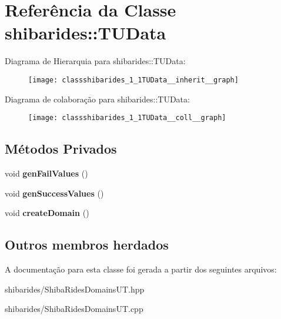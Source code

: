 \hypertarget{classshibarides_1_1TUData}{}\section{Referência da Classe shibarides\+:\+:T\+U\+Data}
\label{classshibarides_1_1TUData}


Diagrama de Hierarquia para shibarides\+:\+:T\+U\+Data\+:\nopagebreak
\begin{figure}[H]
\begin{center}
\leavevmode
\texttt{[image: classshibarides\_1\_1TUData\_\_inherit\_\_graph]}
\end{center}
\end{figure}


Diagrama de colaboração para shibarides\+:\+:T\+U\+Data\+:\nopagebreak
\begin{figure}[H]
\begin{center}
\leavevmode
\texttt{[image: classshibarides\_1\_1TUData\_\_coll\_\_graph]}
\end{center}
\end{figure}
\subsection*{Métodos Privados}
\begin{DoxyCompactItemize}
\item 
void {\bfseries gen\+Fail\+Values} ()\hypertarget{classshibarides_1_1TUData_aec34777c03f4080e1485c656fd19c27f}{}\label{classshibarides_1_1TUData_aec34777c03f4080e1485c656fd19c27f}

\item 
void {\bfseries gen\+Success\+Values} ()\hypertarget{classshibarides_1_1TUData_ad04a9febfb0e66569fbd04fa063c7a56}{}\label{classshibarides_1_1TUData_ad04a9febfb0e66569fbd04fa063c7a56}

\item 
void {\bfseries create\+Domain} ()\hypertarget{classshibarides_1_1TUData_a09460d965b5acca316aee3e8c3bc1111}{}\label{classshibarides_1_1TUData_a09460d965b5acca316aee3e8c3bc1111}

\end{DoxyCompactItemize}
\subsection*{Outros membros herdados}


A documentação para esta classe foi gerada a partir dos seguintes arquivos\+:\begin{DoxyCompactItemize}
\item 
shibarides/Shiba\+Rides\+Domains\+U\+T.\+hpp\item 
shibarides/Shiba\+Rides\+Domains\+U\+T.\+cpp\end{DoxyCompactItemize}
